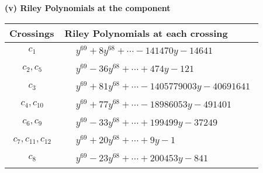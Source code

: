 \documentclass[1p]{elsarticle_modified}
\theoremstyle{definition}
\begin{document}
\flushleft \textbf{(v) Riley Polynomials at the component}\newline \\
\begin{tabular}{m{50pt}|m{274pt}}
Crossings & \hspace{64pt}Riley Polynomials at each crossing \\
\hline $$\begin{aligned}c_{1}\end{aligned}$$&$\begin{aligned}
&y^{69}+8 y^{68}+\cdots-141470 y-14641
\end{aligned}$\\
\hline $$\begin{aligned}c_{2},c_{5}\end{aligned}$$&$\begin{aligned}
&y^{69}-36 y^{68}+\cdots+474 y-121
\end{aligned}$\\
\hline $$\begin{aligned}c_{3}\end{aligned}$$&$\begin{aligned}
&y^{69}+81 y^{68}+\cdots-1405779003 y-40691641
\end{aligned}$\\
\hline $$\begin{aligned}c_{4},c_{10}\end{aligned}$$&$\begin{aligned}
&y^{69}+77 y^{68}+\cdots-18986053 y-491401
\end{aligned}$\\
\hline $$\begin{aligned}c_{6},c_{9}\end{aligned}$$&$\begin{aligned}
&y^{69}-33 y^{68}+\cdots+199499 y-37249
\end{aligned}$\\
\hline $$\begin{aligned}c_{7},c_{11},c_{12}\end{aligned}$$&$\begin{aligned}
&y^{69}+20 y^{68}+\cdots+9 y-1
\end{aligned}$\\
\hline $$\begin{aligned}c_{8}\end{aligned}$$&$\begin{aligned}
&y^{69}-23 y^{68}+\cdots+200453 y-841
\end{aligned}$\\
\hline
\end{tabular}\\~\\
\end{document}
